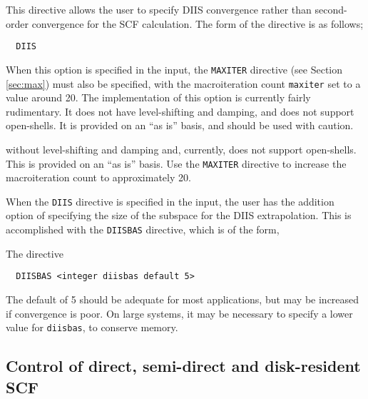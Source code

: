 This directive allows the user to specify DIIS convergence rather than
second-order convergence for the SCF calculation.  The form of the
directive is as follows;

\begin{verbatim}
  DIIS
\end{verbatim}

When this option is specified in the input, the \verb+MAXITER+ directive
(see Section \ref{sec:max}) must also be specified, with the macroiteration
count \verb+maxiter+ set to a value around 20.
The implementation of this option is currently fairly rudimentary.  It
does not have level-shifting and damping, and does not support open-shells.
It is provided on an ``as is'' basis, and should be used with caution.

without level-shifting and damping and, currently, does not support
open-shells. This is provided on an ``as is'' basis. Use the
\verb+MAXITER+ directive to increase the macroiteration count to
approximately 20.

When the \verb+DIIS+ directive is specified in the input, the user has
the addition option of specifying the size of the subspace for the DIIS
extrapolation.  This is accomplished with the \verb+DIISBAS+ directive,
which is of the form,

The directive
\begin{verbatim}
  DIISBAS <integer diisbas default 5>
\end{verbatim}


The default of 5 should be adequate for most applications, but may be
increased if convergence is poor.  On large systems, it may be necessary
to specify a lower value for \verb+diisbas+, to conserve memory.

\subsection{Control of direct, semi-direct and disk-resident SCF}
\label{sec:semidirect}

